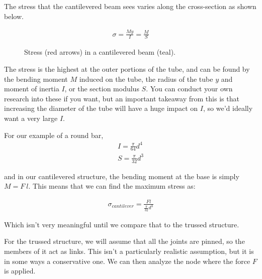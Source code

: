 The stress that the cantilevered beam sees varies along the cross-section as shown below.

\begin{figure}[H]
\begin{subfigure}[b]{.4\linewidth}
\end{subfigure}\begin{subfigure}[b]{.5\linewidth}
\large
\begin{align}
	\sigma = \frac{M y}{I} = \frac{M}{S}
\end{align}
\end{subfigure}
\caption{Stress (red arrows) in a cantilevered beam (teal).}
\end{figure}

The stress is the highest at the outer portions of the tube, and can be found by the bending moment $M$ induced on the tube, the radius of the tube $y$ and moment of inertia $I$, or the section modulus $S$. You can conduct your own research into these if you want, but an important takeaway from this is that increasing the diameter of the tube will have a huge impact on $I$, so we'd ideally want a very large $I$.

For our example of a round bar,
\begin{align}
	I = \frac{\pi}{64}d^4 \\
	S = \frac{\pi}{32}d^3
\end{align}

and in our cantilevered structure, the bending moment at the base is simply $M = F \ l$. This means that we can find the maximum stress as:

\begin{align}
	\sigma_{cantilever} = \frac{F l}{\frac{\pi}{32}d^3}
\end{align}

Which isn't very meaningful until we compare that to the trussed structure.

For the trussed structure, we will assume that all the joints are pinned, so the members of it act as links. This isn't a particularly realistic assumption, but it is in some ways a conservative one. We can then analyze the node where the force $F$ is applied.

